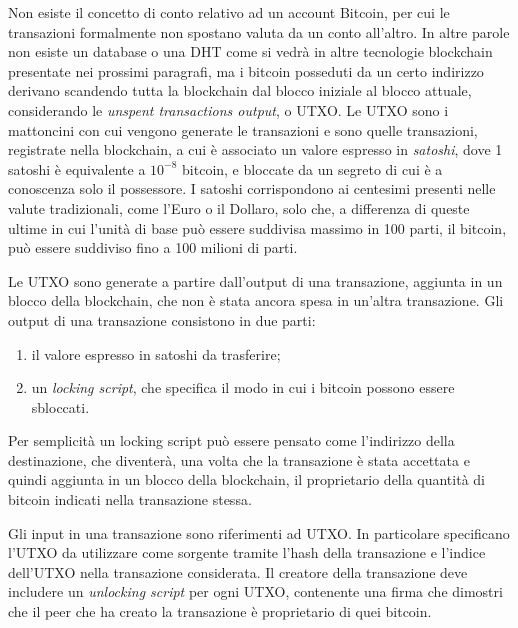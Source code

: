 Non esiste il concetto di conto relativo ad un account Bitcoin, per cui le transazioni formalmente non spostano valuta da un conto all'altro. In altre parole non esiste un database o una DHT come si vedrà in altre tecnologie blockchain presentate nei prossimi paragrafi, ma i bitcoin posseduti da un certo indirizzo derivano scandendo tutta la blockchain dal blocco iniziale al blocco attuale, considerando le \emph{unspent transactions output}, o UTXO. Le UTXO sono i mattoncini con cui vengono generate le transazioni e sono quelle transazioni, registrate nella blockchain, a cui è associato un valore espresso in \emph{satoshi}, dove 1 satoshi è equivalente a $10^{-8}$ bitcoin, e bloccate da un segreto di cui è a conoscenza solo il possessore. I satoshi corrispondono ai centesimi presenti nelle valute tradizionali, come l'Euro o il Dollaro, solo che, a differenza di queste ultime in cui l'unità di base può essere suddivisa massimo in 100 parti, il bitcoin, può essere suddiviso fino a 100 milioni di parti.

Le UTXO sono generate a partire dall'output di una transazione, aggiunta in un blocco della blockchain, che non è stata ancora spesa in un'altra transazione. Gli output di una transazione consistono in due parti:

\begin{enumerate}
	\item il valore espresso in satoshi da trasferire;
	\item un \emph{locking script}, che specifica il modo in cui i bitcoin possono essere sbloccati.
\end{enumerate}

Per semplicità un locking script può essere pensato come l'indirizzo della destinazione, che diventerà, una volta che la transazione è stata accettata e quindi aggiunta in un blocco della blockchain, il proprietario della quantità di bitcoin indicati nella transazione stessa.

Gli input in una transazione sono riferimenti ad UTXO. In particolare specificano l'UTXO da utilizzare come sorgente tramite l'hash della transazione e l'indice dell'UTXO nella transazione considerata. Il creatore della transazione deve includere un \emph{unlocking script} per ogni UTXO, contenente una firma che dimostri che il peer che ha creato la transazione è proprietario di quei bitcoin.

